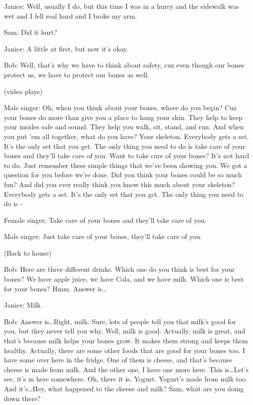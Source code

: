Janice: Well, usually I do, but this time I was in a hurry and the sidewalk was wet and I fell real hard and I broke my arm.

Sam: Did it hurt?

Janice: A little at first, but now it's okay.

Bob: Well, that's why we have to think about safety, cuz even though our bones protect us, we have to protect our bones as well.

(video plays)

Male singer: Oh, when you think about your bones, where do you begin? Cuz your bones do more than give you a place to hang your skin. They help to keep your insides safe and sound. They help you walk, sit, stand, and run. And when you put 'em all together, what do you have? Your skeleton. Everybody gets a set. It's the only set that you get. The only thing you need to do is take care of your bones and they'll take care of you. Want to take care of your bones? It's not hard to do. Just remember these simple things that we've been showing you. We got a question for you before we're done. Did you think your bones could be so much fun? And did you ever really think you know this much about your skeleton? Everybody gets a set. It's the only set that you get. The only thing you need to do is -

Female singer: Take care of your bones and they'll take care of you.

Male singer: Just take care of your bones, they'll take care of you.

(Back to house)

Bob: Here are three different drinks. Which one do you think is best for your bones? We have apple juice, we have Cola, and we have milk. Which one is best for your bones? Hmm. Answer is\dots

Janice: Milk.

Bob: Answer is\dots Right, milk. Sure, lots of people tell you that milk's good for you, but they never tell you why. Well, milk is good. Actually, milk is great, and that's because milk helps your bones grow. It makes them strong and keeps them healthy. Actually, there are some other foods that are good for your bones too. I have some over here in the fridge. One of them is cheese, and that's because cheese is made from milk. And the other one, I have one more here. This is\dots Let's see, it's in here somewhere. Oh, there it is. Yogurt. Yogurt's made from milk too. And it's\dots Hey, what happened to the cheese and milk? Sam, what are you doing down there?

